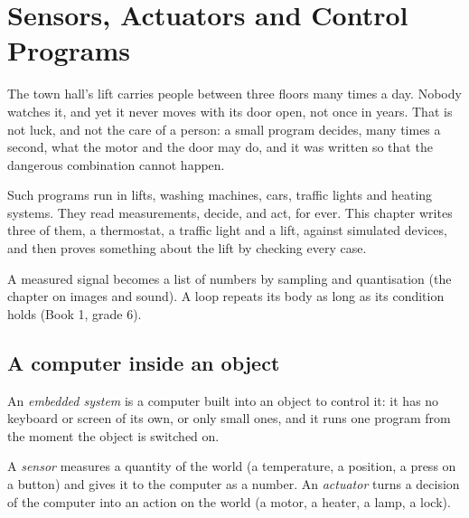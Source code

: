 \chapter{Sensors, Actuators and Control Programs}\label{ch:g10:sensors-actuators-control}

The town hall's lift carries people between three floors many times a day. Nobody watches it, and yet it never
moves with its door open, not once in years. That is not luck, and not the care of a person: a small program
decides, many times a second, what the motor and the door may do, and it was written so that the dangerous
combination cannot happen.

Such programs run in lifts, washing machines, cars, traffic lights and heating systems. They read measurements,
decide, and act, for ever. This chapter writes three of them, a thermostat, a traffic light and a lift, against
simulated devices, and then proves something about the lift by checking every case.

\begin{recall}
A measured signal becomes a list of numbers by sampling and quantisation (the chapter on images and sound). A
 loop repeats its body as long as its condition holds (Book 1, grade 6).
\end{recall}

\section{A computer inside an object}\label{sec:g10:sensors-actuators-control:embedded}

\begin{definition}\label{def:g10:sensors-actuators-control:embedded}
An \emph{embedded system} is a computer built into an object to control it: it has no
keyboard or screen of its own, or only small ones, and it runs one program from the moment the object is switched
on.
\end{definition}

\begin{definition}\label{def:g10:sensors-actuators-control:sensor}
A \emph{sensor} measures a quantity of the world (a temperature, a position, a press on a button) and
gives it to the computer as a number. An \emph{actuator} turns a decision of the computer into an
action on the world (a motor, a heater, a lamp, a lock).
\end{definition}

